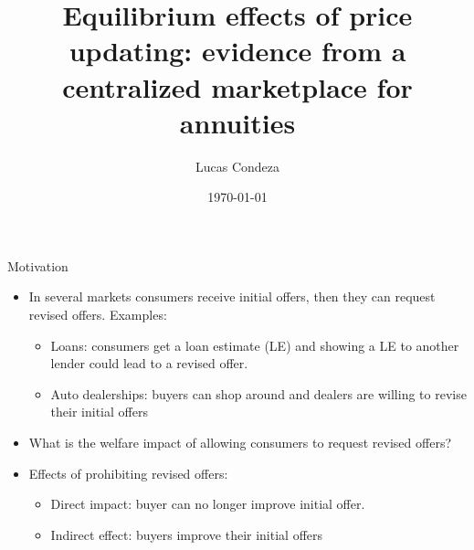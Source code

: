 \documentclass[10pt,aspectratio=169]{beamer}
\title{Equilibrium effects of price updating: evidence from a centralized marketplace for annuities}
\author{%
 Lucas Condeza
\inst{1} \and
}
\institute{
  \inst{1} Yale University \\
}
\date{\today}
\begin{document}
\begin{frame}
  \titlepage
\end{frame}




\begin{frame}{Motivation}\label{slide:motivation}
\begin{itemize}
    \item  In several markets consumers receive initial offers, then they can request revised offers. Examples: 
    \begin{itemize}
        \item Loans: consumers get a loan estimate (LE) and showing a LE to another lender could lead to a revised offer. \hyperlink{slide:fig_LE}{} %
        \item Auto dealerships: buyers can shop around and dealers are willing to revise their initial offers %
    \end{itemize}

    \item What is  the welfare impact of allowing consumers to request revised offers?
    \item Effects of prohibiting revised offers: 
    
    \begin{itemize}
        \item Direct impact: buyer can no longer improve initial offer. 
        \item Indirect effect: buyers improve their initial offers 
    \end{itemize}

    
\end{itemize}



\end{frame}
\end{document}
